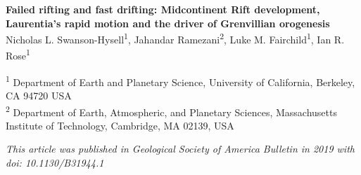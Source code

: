 \documentclass[11pt,letterpaper]{article}
\begin{document}
\begin{flushleft}
{\Large \textbf{Failed rifting and fast drifting: Midcontinent Rift development, Laurentia's rapid motion and the driver of Grenvillian orogenesis}}
\\

Nicholas L. Swanson-Hysell\textsuperscript{1},
Jahandar Ramezani\textsuperscript{2},
Luke M. Fairchild\textsuperscript{1},
Ian R. Rose\textsuperscript{1}

\bigskip

\textsuperscript{1} Department of Earth and Planetary Science, University of California, Berkeley, CA 94720 USA
\\
\textsuperscript{2} Department of Earth, Atmospheric, and Planetary Sciences, Massachusetts Institute of Technology, Cambridge, MA 02139, USA
\bigskip

\end{flushleft}

\noindent\textit{This article was published in Geological Society of America Bulletin in 2019 with doi: 10.1130/B31944.1}

\end{document}
